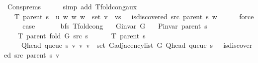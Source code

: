 \begin{isabellebody}
\ Cons{\isachardot}{\kern0pt}prems\isanewline
\ \ \ \ \isamarkupfalse%
\ {\isacharparenleft}{\kern0pt}simp\ add{\isacharcolon}{\kern0pt}\ T{\isacharunderscore}{\kern0pt}fold{\isacharunderscore}{\kern0pt}cong{\isacharunderscore}{\kern0pt}aux{\isacharparenright}{\kern0pt}\isanewline
\ \ \isamarkupfalse%
\ \isamarkupfalse%
\ {\isachardoublequoteopen}{\isachardot}{\kern0pt}{\isachardot}{\kern0pt}{\isachardot}{\kern0pt}\ {\isacharequal}{\kern0pt}\ T\ {\isacharparenleft}{\kern0pt}parent\ s{\isacharparenright}{\kern0pt}\ {\isasymunion}\ {\isacharbraceleft}{\kern0pt}{\isacharparenleft}{\kern0pt}u{\isacharcomma}{\kern0pt}\ w{\isacharparenright}{\kern0pt}\ {\isacharbar}{\kern0pt}w{\isachardot}{\kern0pt}\ w\ {\isasymin}\ set\ {\isacharparenleft}{\kern0pt}v\ {\isacharhash}{\kern0pt}\ vs{\isacharparenright}{\kern0pt}\ {\isasymand}\ {\isasymnot}\ is{\isacharunderscore}{\kern0pt}discovered\ src\ {\isacharparenleft}{\kern0pt}parent\ s{\isacharparenright}{\kern0pt}\ w{\isacharbraceright}{\kern0pt}{\isachardoublequoteclose}\isanewline
\ \ \ \ \isamarkupfalse%
\ force\isanewline
\ \ \isamarkupfalse%
\ \isamarkupfalse%
\ {\isacharquery}{\kern0pt}case\isanewline
\ \ \ \ \isacommand{{\isachardot}{\kern0pt}}\isamarkupfalse%
\isanewline
{}\isamarkupfalse%
%
\endisatagproof
{\isafoldproof}%
%
\isadelimproof
\isanewline
%
\endisadelimproof
\isanewline
{}\isamarkupfalse%
\ {\isacharparenleft}{\kern0pt}\ bfs{\isacharparenright}{\kern0pt}\ T{\isacharunderscore}{\kern0pt}fold{\isacharunderscore}{\kern0pt}cong{\isacharunderscore}{\kern0pt}{}{\isacharcolon}{\kern0pt}\isanewline
\ \ \ {\isachardoublequoteopen}G{\isachardot}{\kern0pt}invar\ G{\isachardoublequoteclose}\isanewline
\ \ \ {\isachardoublequoteopen}P{\isacharunderscore}{\kern0pt}invar\ {\isacharparenleft}{\kern0pt}parent\ s{\isacharparenright}{\kern0pt}{\isachardoublequoteclose}\isanewline
\ \ \isanewline
\ \ \ \ {\isachardoublequoteopen}T\ {\isacharparenleft}{\kern0pt}parent\ {\isacharparenleft}{\kern0pt}fold\ G\ src\ s{\isacharparenright}{\kern0pt}{\isacharparenright}{\kern0pt}\ {\isacharequal}{\kern0pt}\isanewline
\ \ \ \ \ T\ {\isacharparenleft}{\kern0pt}parent\ s{\isacharparenright}{\kern0pt}\ {\isasymunion}\isanewline
\ \ \ \ \ {\isacharbraceleft}{\kern0pt}{\isacharparenleft}{\kern0pt}Q{\isacharunderscore}{\kern0pt}head\ {\isacharparenleft}{\kern0pt}queue\ s{\isacharparenright}{\kern0pt}{\isacharcomma}{\kern0pt}\ v{\isacharparenright}{\kern0pt}\ {\isacharbar}{\kern0pt}v{\isachardot}{\kern0pt}\ v\ {\isasymin}\ set\ {\isacharparenleft}{\kern0pt}G{\isachardot}{\kern0pt}adjacency{\isacharunderscore}{\kern0pt}list\ G\ {\isacharparenleft}{\kern0pt}Q{\isacharunderscore}{\kern0pt}head\ {\isacharparenleft}{\kern0pt}queue\ s{\isacharparenright}{\kern0pt}{\isacharparenright}{\kern0pt}{\isacharparenright}{\kern0pt}\ {\isasymand}\ {\isasymnot}\ is{\isacharunderscore}{\kern0pt}discovered\ src\ {\isacharparenleft}{\kern0pt}parent\ s{\isacharparenright}{\kern0pt}\ v{\isacharbraceright}{\kern0pt}{\isachardoublequoteclose}\isanewline

\end{isabellebody}
